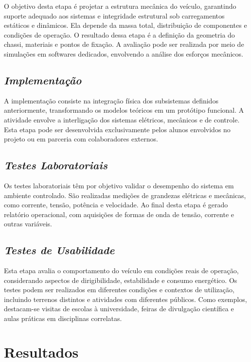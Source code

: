 \documentclass[conference]{IEEEtran}
\begin{document}
O objetivo desta etapa é projetar a estrutura mecânica do veículo, garantindo suporte adequado aos sistemas e integridade estrutural sob carregamentos estáticos e dinâmicos. Ela depende da massa total, distribuição de componentes e condições de operação. O resultado dessa etapa é a definição da geometria do chassi, materiais e pontos de fixação. A avaliação pode ser realizada por meio de simulações em softwares dedicados, envolvendo a análise dos esforços mecânicos.

\subsection{\textit{Implementação}}

A implementação consiste na integração física dos subsistemas definidos anteriormente, transformando os modelos teóricos em um protótipo funcional. A atividade envolve a interligação dos sistemas elétricos, mecânicos e de controle. Esta etapa pode ser desenvolvida exclusivamente pelos alunos envolvidos no projeto ou em parceria com colaboradores externos.

\subsection{\textit{Testes Laboratoriais}}

Os testes laboratoriais têm por objetivo validar o desempenho do sistema em ambiente controlado. São realizadas medições de grandezas elétricas e mecânicas, como corrente, tensão, potência e velocidade. Ao final desta etapa é gerado relatório operacional, com aquisições de formas de onda de tensão, corrente e outras variáveis.

\subsection{\textit{Testes de Usabilidade}}

Esta etapa avalia o comportamento do veículo em condições reais de operação, considerando aspectos de dirigibilidade, estabilidade e consumo energético. Os testes podem ser realizados em diferentes condições e contextos de utilização, incluindo terrenos distintos e atividades com diferentes públicos. Como exemplos, destacam-se visitas de escolas à universidade, feiras de divulgação científica e aulas práticas em disciplinas correlatas.


\section{Resultados}
\end{document}
